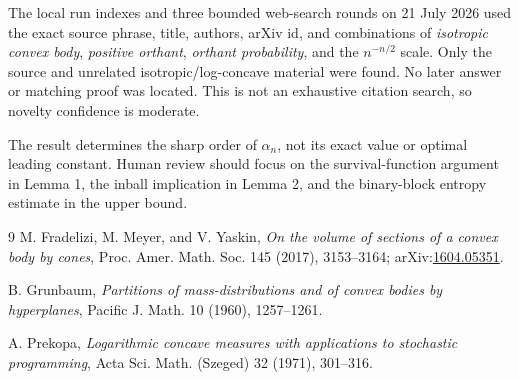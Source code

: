 \documentclass[11pt]{article}
\begin{document}
The local run indexes and three bounded web-search rounds on 21 July 2026
used the exact source phrase, title, authors, arXiv id, and combinations of
\emph{isotropic convex body}, \emph{positive orthant}, \emph{orthant
probability}, and the $n^{-n/2}$ scale.  Only the source and unrelated
isotropic/log-concave material were found.  No later answer or matching proof
was located.  This is not an exhaustive citation search, so novelty confidence
is moderate.

The result determines the sharp order of $\alpha_n$, not its exact value or
optimal leading constant.  Human review should focus on the survival-function
argument in Lemma 1, the inball implication in Lemma 2, and the binary-block
entropy estimate in the upper bound.

\begin{thebibliography}{9}
M. Fradelizi, M. Meyer, and V. Yaskin,
\emph{On the volume of sections of a convex body by cones},
Proc. Amer. Math. Soc. 145 (2017), 3153--3164;
arXiv:\href{https://arxiv.org/abs/1604.05351}{1604.05351}.

B. Grunbaum,
\emph{Partitions of mass-distributions and of convex bodies by hyperplanes},
Pacific J. Math. 10 (1960), 1257--1261.

A. Prekopa,
\emph{Logarithmic concave measures with applications to stochastic
programming},
Acta Sci. Math. (Szeged) 32 (1971), 301--316.
\end{thebibliography}
\end{document}
